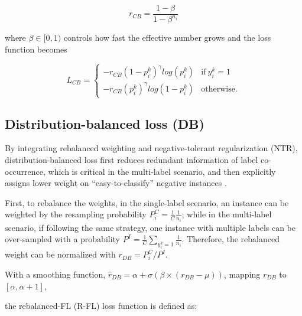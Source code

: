 \documentclass[11pt]{article}
\begin{document}
\small
\begin{equation}
r_{CB} = \frac{1-\beta}{1-\beta^{n_i}}
\end{equation}
\normalsize

where 
$\beta \in [0,1)$ controls how fast the effective number grows
and the loss function becomes

\begin{comment}
\small
\begin{equation}
L_{CB} = -r_{CB}[y_{i}^{k}(1-p_{i}^{k})log(p_{i}^{k}) +(1-y_{i}^{k}) p_{i}^{k}log(1-p_{i}^{k}) ]
\end{equation}
\normalsize
\end{comment}


\small
  \begin{equation}
    L_{CB}=
    \begin{cases}
      -r_{CB} (1-p_{i}^{k})^{\gamma}log(p_{i}^{k}) & \text{if}\ y_{i}^{k}=1 \\
      -r_{CB} {(p_{i}^{k})}^{\gamma}log(1-p_{i}^{k}) & \text{otherwise.}
    \end{cases}
  \end{equation}
\normalsize


\subsection{Distribution-balanced loss (DB)}
By integrating rebalanced weighting and negative-tolerant regularization (NTR), distribution-balanced loss first reduces redundant information of label co-occurrence, which is critical in the multi-label scenario, and then explicitly assigns lower weight on “easy-to-classify” negative instances \citep{DBLoss}.

First, to rebalance the weights, in the single-label scenario, an instance can be weighted by the resampling probability $P_{i}^{C} = \frac{1}{C} \frac{1}{n_{i}}$; while in the multi-label scenario, if following the same strategy, one instance with multiple labels can be over-sampled with a probability $P^{I} = \frac{1}{C} \sum_{y_i^k=1}\frac{1}{n_{i}}$. Therefore, the rebalanced weight can be normalized with $r_{DB} = P_{i}^{C}/P^{I}$.
\begin{comment}
\small
\begin{equation}
r_{DB} = P_{i}^{C}/P^{I}
\end{equation}
\normalsize
\end{comment}
With a smoothing function, $\hat{r}_{DB} = \alpha + \sigma(\beta \times (r_{DB} -\mu))$, mapping $r_{DB}$ to $[\alpha, \alpha+1]$, 
\begin{comment}
\small
\begin{equation}
\hat{r}_{DB} = \alpha + \sigma(\beta \times (r_{DB} -\mu))
\label{eq:rdbsmooth}
\end{equation}
\normalsize
\end{comment}
the rebalanced-FL (R-FL) loss function is defined as:
\end{document}
